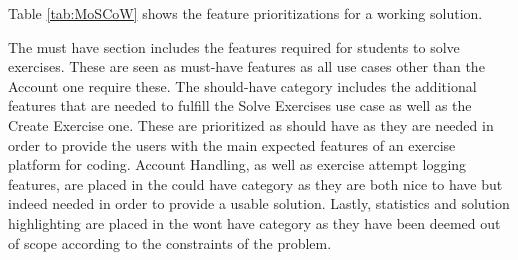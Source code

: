 Table \ref{tab:MoSCoW} shows the feature prioritizations for a working solution.

The must have section includes the features required for students to solve exercises. These are seen as must-have features as all use cases other than the Account one require these.
The should-have category includes the additional features that are needed to fulfill the Solve Exercises use case as well as the Create Exercise one.
These are prioritized as should have as they are needed in order to provide the users with the main expected features of an exercise platform for coding.
Account Handling, as well as exercise attempt logging features, are placed in the could have category as they are both nice to have but indeed needed in order to provide a usable solution.
Lastly, statistics and solution highlighting are placed in the wont have category as they have been deemed out of scope according to the constraints of the problem.


